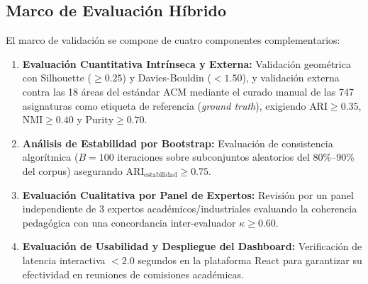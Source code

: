 \vspace{0.3cm}

\subsection{Marco de Evaluación Híbrido}
\label{sec:evaluation_framework}

El marco de validación se compone de cuatro componentes complementarios:
\begin{enumerate}[label=\alph*)]
	\item \textbf{Evaluación Cuantitativa Intrínseca y Externa:} Validación geométrica con Silhouette ($\ge 0.25$) y Davies-Bouldin ($< 1.50$), y validación externa contra las 18 áreas del estándar ACM mediante el curado manual de las 747 asignaturas como etiqueta de referencia (\textit{ground truth}), exigiendo $\text{ARI} \ge 0.35$, $\text{NMI} \ge 0.40$ y $\text{Purity} \ge 0.70$.
	\item \textbf{Análisis de Estabilidad por Bootstrap:} Evaluación de consistencia algorítmica ($B = 100$ iteraciones sobre subconjuntos aleatorios del 80\%–90\% del corpus) asegurando $\text{ARI}_{\text{estabilidad}} \ge 0.75$.
	\item \textbf{Evaluación Cualitativa por Panel de Expertos:} Revisión por un panel independiente de 3 expertos académicos/industriales evaluando la coherencia pedagógica con una concordancia inter-evaluador $\kappa \ge 0.60$.
	\item \textbf{Evaluación de Usabilidad y Despliegue del Dashboard:} Verificación de latencia interactiva $< 2.0$ segundos en la plataforma React para garantizar su efectividad en reuniones de comisiones académicas.
\end{enumerate}
